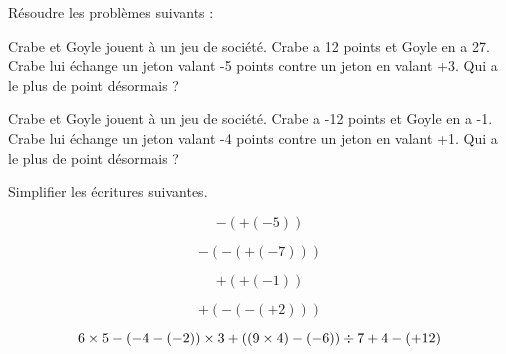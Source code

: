  Résoudre les problèmes suivants :

\begin{minipage}{0.45\textwidth}
    Crabe et Goyle jouent à un jeu de société. Crabe a 12 points et Goyle en a 27.
    Crabe lui échange un jeton valant -5 points contre un jeton en valant +3. 
    Qui a le plus de point désormais ?
    \vspace*{8em}
\end{minipage}
\hfil
\vrule
\hfil
\begin{minipage}{0.45\textwidth}
    Crabe et Goyle jouent à un jeu de société. Crabe a -12 points et Goyle en a -1.
    Crabe lui échange un jeton valant -4 points contre un jeton en valant +1. 
    Qui a le plus de point désormais ?
    \vspace*{8em}
\end{minipage}

 Simplifier les écritures suivantes.

\begin{multicols}{2}
    $$-(+(-5))$$
    \vspace*{3em}

    $$-(-(+(-7)))$$
    \vspace*{7em}\columnbreak

    $$+(+(-1))$$
    \vspace*{3em}

    $$+(-(-(+2)))$$
    \vspace*{7em}
\end{multicols}


$$6\times 5 -(-4-(-2))\times 3 +((9\times 4)-(-6))\div 7+\noindent4-(+12)$$
